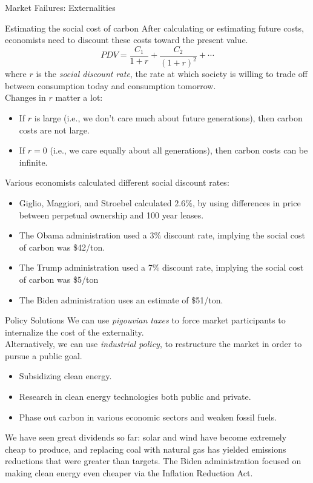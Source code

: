 \documentclass[10pt]{extarticle}
\begin{document}
\begin{problem}{Market Failures: Externalities}
\begin{problem}{Estimating the social cost of carbon}
      After calculating or estimating future costs, economists need to discount these costs toward the present value.
      \[
        PDV = \frac{C_1}{1+r} + \frac{C_2}{(1+r)^2} + \cdots
      \] 
      where $r$ is the \textit{social discount rate}, the rate at which society is willing to trade off between consumption today and consumption tomorrow.\\

      Changes in $r$ matter a lot:
      \begin{itemize}
        \item If $r$ is large (i.e., we don't care much about future generations), then carbon costs are not large.
        \item If $r = 0$ (i.e., we care equally about all generations), then carbon costs can be infinite.
      \end{itemize}
      Various economists calculated different social discount rates:
      \begin{itemize}
        \item Giglio, Maggiori, and Stroebel calculated $2.6\%$, by using differences in price between perpetual ownership and 100 year leases.
        \item The Obama administration used a 3\% discount rate, implying the social cost of carbon was \$42/ton.
        \item The Trump administration used a 7\% discount rate, implying the social cost of carbon was \$5/ton
        \item The Biden administration uses an estimate of \$51/ton.
      \end{itemize}
    \end{problem}
  \end{problem}
  \begin{problem}{Policy Solutions}
    We can use \textit{pigouvian taxes} to force market participants to internalize the cost of the externality.\\

    Alternatively, we can use \textit{industrial policy}, to restructure the market in order to pursue a public goal.
    \begin{itemize}
      \item Subsidizing clean energy.
      \item Research in clean energy technologies both public and private.
      \item Phase out carbon in various economic sectors and weaken fossil fuels.
    \end{itemize}
    We have seen great dividends so far: solar and wind have become extremely cheap to produce, and replacing coal with natural gas has yielded emissions reductions that were greater than targets. The Biden administration focused on making clean energy even cheaper via the Inflation Reduction Act.
  \end{problem}
\end{document}

